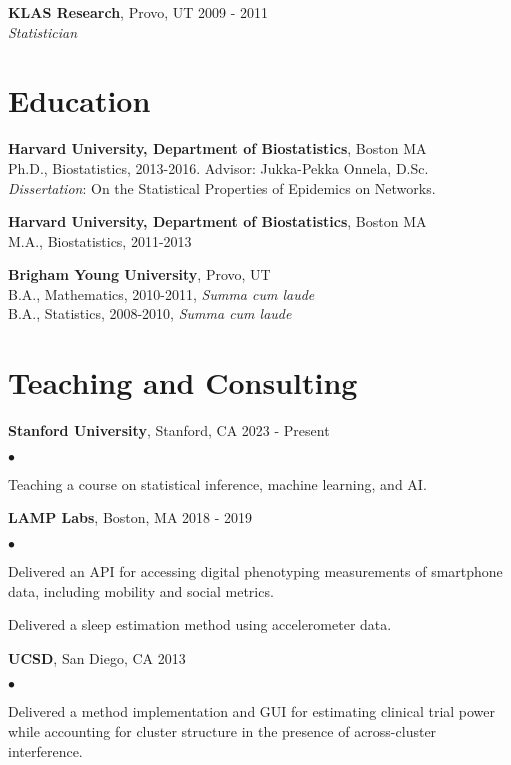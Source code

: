 \documentclass[margin,line]{res}
\newenvironment{bulletlist}{
  \begin{list}{$\bullet$}{%
      \setlength{\itemsep}{0in}
      \setlength{\parsep}{0in}
      \setlength{\parskip}{0in}
      \setlength{\topsep}{0in}
      \setlength{\partopsep}{0in}
      \setlength{\leftmargin}{0.15in}
      \setlength{\labelwidth}{0.05in}
      \setlength{\labelsep}{0.1in}
      \setlength{\itemindent}{0in}
      \setlength{\rightmargin}{0in}}}
  {\end{list}}
\begin{document}
\begin{resume}
{\bf KLAS Research}, Provo, UT  \hfill 2009 - 2011\\
\textit{Statistician} \\[.15cm]

\pagebreak
\section{\sc Education}
{\bf Harvard University, Department of Biostatistics}, Boston MA \\
Ph.D., Biostatistics, 2013-2016. Advisor: Jukka-Pekka Onnela, D.Sc. \\
\textit{Dissertation}: On the Statistical Properties of Epidemics on Networks.

{\bf Harvard University, Department of Biostatistics}, Boston MA \\
M.A., Biostatistics, 2011-2013

{\bf Brigham Young University}, Provo, UT \\
B.A., Mathematics, 2010-2011, \textit{Summa cum laude} \\
B.A., Statistics, 2008-2010, \textit{Summa cum laude}

\section{\sc Teaching and Consulting}
{\bf Stanford University}, Stanford, CA  \hfill 2023 - Present\\[-.35cm]
\begin{bulletlist}
\item Teaching a course on statistical inference, machine learning, and AI.
\end{bulletlist}

{\bf LAMP Labs}, Boston, MA  \hfill 2018 - 2019\\[-.35cm]
\begin{bulletlist}
\item Delivered an API for accessing digital phenotyping measurements of smartphone data, including mobility and social metrics.
\item Delivered a sleep estimation method using accelerometer data.
\end{bulletlist}

{\bf UCSD}, San Diego, CA  \hfill 2013\\[-.35cm]
\begin{bulletlist}
\item Delivered a method implementation and GUI for estimating clinical trial power while accounting for cluster structure in the presence of across-cluster interference.
\end{bulletlist}


\end{resume}
\end{document}
